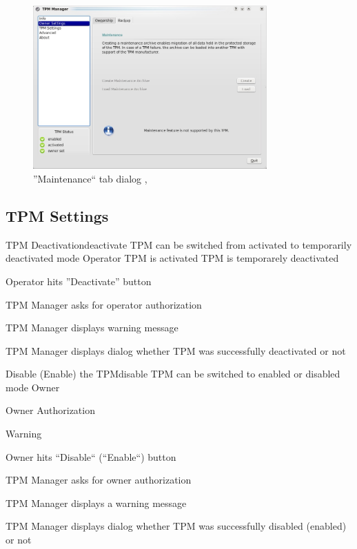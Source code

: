 \documentclass[
  american        %
]{sirrixreport}
\begin{document}
\begin{figure}[h]
 \centering
 \includegraphics[width=0.8\textwidth]{images/uc8090.jpg}
 \caption{''Maintenance`` tab dialog , }
\end{figure}
\clearpage

\subsection{TPM Settings}

\begin{usecase}{TPM Deactivation}{deactivate}
\ucdesc TPM can be switched from activated to temporarily deactivated mode
\ucactors  Operator
\ucprecond TPM is activated
\ucpostcond TPM is temporarely deactivated
\ucnormal 
 \item Operator hits ''Deactivate'' button
 \item TPM Manager asks for operator authorization
 \item TPM Manager displays warning message
 \item TPM Manager displays dialog whether TPM was successfully deactivated or not
\ucendflow
\end{usecase}
\clearpage

\begin{usecase}{Disable (Enable) the TPM}{disable}
\ucdesc TPM can be switched to enabled or disabled mode
\ucactors  Owner
\ucinclude 
   \begin{compactitem}
      \item Owner Authorization 
      \item Warning 
   \end{compactitem}
\ucnormal 
 \item Owner hits ``Disable`` (``Enable``) button
 \item TPM Manager asks for owner authorization
 \item TPM Manager displays a warning message
 \item TPM Manager displays dialog whether TPM was successfully disabled (enabled) or not
\ucendflow
\end{usecase}
\end{document}
